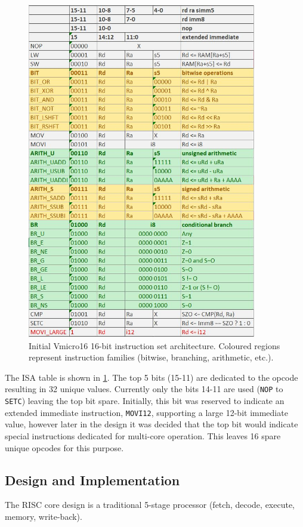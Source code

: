 \begin{figure}[h]
\centering 
\includegraphics[width=10cm]{../img/isa}
\caption{Initial Vmicro16 16-bit instruction set architecture. Coloured regions represent instruction families (bitwise, branching, arithmetic, etc.).}
\label{fig:isa}
\end{figure}
The ISA table is shown in \cref{fig:isa}. The top 5 bits (15-11) are dedicated to the opcode resulting in 32 unique values. Currently only the bits 14-11 are used (\verb|NOP| to \verb|SETC|) leaving the top bit spare. Initially, this bit was reserved to indicate an extended immediate instruction, \verb|MOVI12|, supporting a large 12-bit immediate value, however later in the design it was decided that the top bit would indicate special instructions dedicated for multi-core operation. This leaves 16 spare unique opcodes for this purpose.


\newpage
\subsection{Design and Implementation}
The RISC core design is a traditional 5-stage processor (fetch, decode, execute, memory, write-back).

